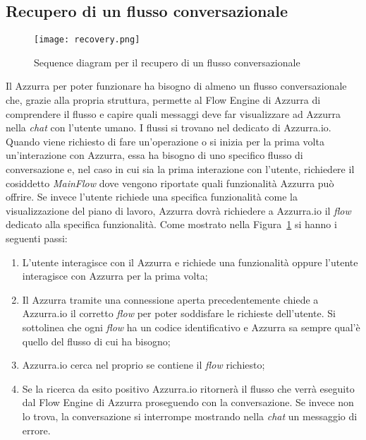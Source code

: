 \subsection{Recupero di un flusso conversazionale}
\begin{figure}[h]
	\begin{center}
		\texttt{[image: recovery.png]}
		\caption{Sequence diagram per il recupero di un flusso conversazionale}\label{fig:recovery}
	\end{center}
\end{figure}
Il  Azzurra per poter funzionare ha bisogno di almeno un flusso conversazionale che, grazie alla propria struttura, permette al Flow Engine di Azzurra di comprendere il flusso e capire quali messaggi deve far visualizzare ad Azzurra nella \emph{chat} con l'utente umano. I flussi si trovano nel  dedicato di Azzurra.io. Quando viene richiesto di fare un’operazione o si inizia per la prima volta un'interazione con Azzurra, essa ha bisogno di uno specifico flusso di conversazione e, nel caso in cui sia la prima interazione con l'utente, richiedere il cosiddetto \emph{MainFlow} dove vengono riportate quali funzionalità Azzurra può offrire. Se invece l'utente richiede una specifica funzionalità come la visualizzazione del piano di lavoro, Azzurra dovrà richiedere a Azzurra.io il \emph{flow} dedicato alla specifica funzionalità.
Come mostrato nella Figura~\ref{fig:recovery} si hanno i seguenti passi:
\begin{enumerate}
\item L'utente interagisce con il  Azzurra e richiede una funzionalità oppure l'utente interagisce con Azzurra per la prima volta;
\item Il  Azzurra tramite una connessione aperta precedentemente chiede a Azzurra.io il corretto \emph{flow} per poter soddisfare le richieste dell'utente. Si sottolinea che ogni \emph{flow} ha un codice identificativo e Azzurra sa sempre qual'è quello del flusso di cui ha bisogno;
\item Azzurra.io cerca nel proprio  se contiene il \emph{flow} richiesto;
\item Se la ricerca da esito positivo Azzurra.io ritornerà il flusso che verrà eseguito dal Flow Engine di Azzurra proseguendo con la conversazione. Se invece non lo trova, la conversazione si interrompe mostrando nella \emph{chat} un messaggio di errore.
\end{enumerate}

